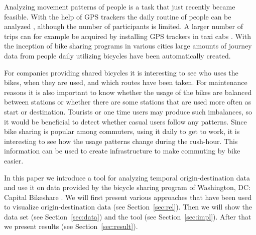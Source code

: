 Analyzing movement patterns of people is a task that just recently became
feasible. With the help of GPS trackers the daily routine of people can
be analyzed \cite{geo1, geo2, geo3}, although the number of participants
is limited. A larger number of trips can for example be acquired
by installing GPS trackers in taxi cabs \cite{Ferreira2013, Guo2012}.
With the inception of bike sharing programs in various cities large
amounts of journey data from people daily utilizing bicycles have
been automatically created.

For companies providing shared bicycles it is interesting to see who
uses the bikes, when they are used, and which routes have been taken.
For maintenance reasons it is also important to know whether the usage
of the bikes are balanced between stations or whether there are some
stations that are used more often as start or destination.
Tourists or one time users may produce such imbalances, so it
would be beneficial to detect whether casual users follow any patterns.
Since bike sharing is popular among commuters, using it daily to get
to work, it is interesting to see how the usage patterns change during
the rush-hour. This information can be used to create infrastructure
to make commuting by bike easier.

In this paper we introduce a tool for analyzing temporal
origin-destination data and use it on data provided by
the bicycle sharing program
of Washington, DC: Capital Bikeshare \cite{wash}.
We will first present various approaches that have been used
to visualize origin-destination data (see Section~\ref{sec:rel}).
Then we will show the data set (see Section~\ref{sec:data}) and
the tool (see Section~\ref{sec:impl}).
After that we present results (see Section~\ref{sec:result}).
